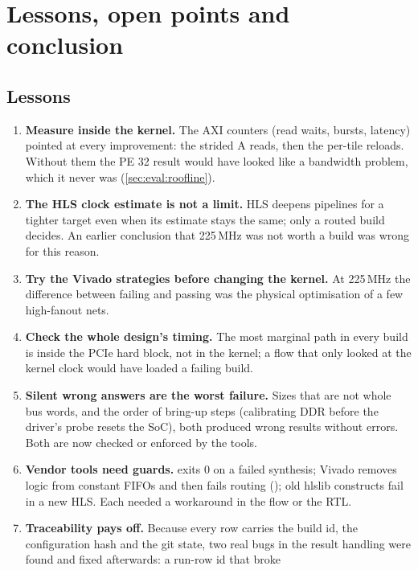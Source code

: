 \section{Lessons, open points and conclusion}
\label{sec:lessons}

\subsection{Lessons}
\begin{enumerate}[leftmargin=1.4em]
  \item \textbf{Measure inside the kernel.} The AXI counters (read waits, bursts, latency) pointed at every
        improvement: the strided A reads, then the per-tile reloads. Without them the PE 32 result would have
        looked like a bandwidth problem, which it never was (\cref{sec:eval:roofline}).
  \item \textbf{The HLS clock estimate is not a limit.} HLS deepens pipelines for a tighter target even when its
        estimate stays the same; only a routed build decides. An earlier conclusion that 225\,MHz was not worth a
        build was wrong for this reason.
  \item \textbf{Try the Vivado strategies before changing the kernel.} At 225\,MHz the difference between failing and
        passing was the physical optimisation of a few high-fanout nets.
  \item \textbf{Check the whole design's timing.} The most marginal path in every build is inside the PCIe hard block,
        not in the kernel; a flow that only looked at the kernel clock would have loaded a failing build.
  \item \textbf{Silent wrong answers are the worst failure.} Sizes that are not whole bus words, and the order of
        bring-up steps (calibrating DDR before the driver's probe resets the SoC), both produced wrong results without
        errors. Both are now checked or enforced by the tools.
  \item \textbf{Vendor tools need guards.}  exits 0 on a failed synthesis; Vivado removes logic from
        constant FIFOs and then fails routing (); old hlslib constructs fail in a new HLS. Each
        needed a workaround in the flow or the RTL.
  \item \textbf{Traceability pays off.} Because every row carries the build id, the configuration hash and the git
        state, two real bugs in the result handling were found and fixed afterwards: a run-row id that broke

\end{enumerate}
